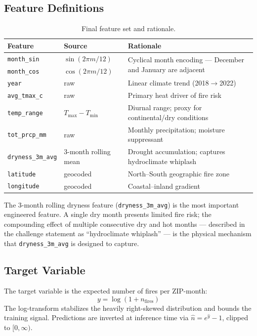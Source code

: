 \documentclass[11pt,a4paper]{article}
\begin{document}
\subsection{Feature Definitions}

\begin{table}[H]
\centering
\caption{Final feature set and rationale.}
\begin{tabular}{lll}
\toprule
\textbf{Feature} & \textbf{Source} & \textbf{Rationale} \\
\midrule
\texttt{month\_sin} & $\sin(2\pi m/12)$ & \multirow{2}{*}{Cyclical month encoding — December and January are adjacent} \\
\texttt{month\_cos} & $\cos(2\pi m/12)$ & \\
\texttt{year} & raw & Linear climate trend (2018$\to$2022) \\
\texttt{avg\_tmax\_c} & raw & Primary heat driver of fire risk \\
\texttt{temp\_range} & $T_{\max} - T_{\min}$ & Diurnal range; proxy for continental/dry conditions \\
\texttt{tot\_prcp\_mm} & raw & Monthly precipitation; moisture suppressant \\
\texttt{dryness\_3m\_avg} & 3-month rolling mean & Drought accumulation; captures hydroclimate whiplash \\
\texttt{latitude} & geocoded & North--South geographic fire zone \\
\texttt{longitude} & geocoded & Coastal--inland gradient \\
\bottomrule
\end{tabular}
\label{tab:features}
\end{table}

The 3-month rolling dryness feature (\texttt{dryness\_3m\_avg}) is the most
important engineered feature. A single dry month presents limited fire risk;
the compounding effect of multiple consecutive dry and hot months --- described
in the challenge statement as ``hydroclimate whiplash'' --- is the physical
mechanism that \texttt{dryness\_3m\_avg} is designed to capture.

\subsection{Target Variable}

The target variable is the expected number of fires per ZIP-month:
\begin{equation}
    y = \log(1 + n_{\text{fires}})
    \label{eq:target}
\end{equation}
The log-transform stabilizes the heavily right-skewed distribution and
bounds the training signal. Predictions are inverted at inference time via
$\hat{n} = e^{\hat{y}} - 1$, clipped to $[0, \infty)$.
\end{document}

